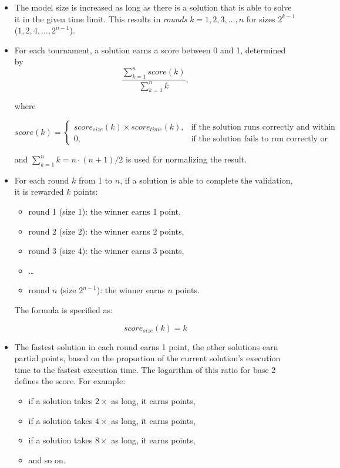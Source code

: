 \documentclass[submission,copyright,creativecommons]{eptcs}
\begin{document}
\begin{itemize}
	\item The model size is increased as long as there is a solution that is able to solve it in the given time limit. This results in \emph{rounds} $k = 1, 2, 3, \ldots, n$ for sizes $2^{k-1}$ ($1, 2, 4, \ldots, 2^{n-1}$).  
	\item For each tournament, a solution earns a score between 0 and 1, determined by
	\[\frac{\sum^{\mathit{n}}_{k=1} \mathit{score}(k)}{\sum^{\mathit{n}}_{k=1} k}, \]
	
	where
	
	\[
	\mathit{score}(k) =
	\begin{cases}
	\mathit{score}_\mathit{size}(k) \times \mathit{score}_\mathit{time}(k), & \text{if the solution runs correctly and within the given time limit,}\\
	0,                                                                      & \text{if the solution fails to run correctly or exceeds the given time limit,}
	\end{cases}
	\]
	
	and $\sum^{\mathit{n}}_{k=1} k = \mathit{n}\cdot(\mathit{n}+1)/2$ is used for normalizing the result.
	
	\item For each round $\mathit{k}$ from 1 to $n$, if a solution is able to complete the validation, it is rewarded $k$ points:
	\begin{itemize}
		\item round 1 (size 1): the winner earns 1 point,
		\item round 2 (size 2): the winner earns 2 points,
		\item round 3 (size 4): the winner earns 3 points,
		\item \ldots
		\item round $n$ (size $2^{n-1}$): the winner earns $n$ points.
	\end{itemize}
	
	The formula is specified as:
	
	\[ \mathit{score}_\mathit{size}(k)= k \]
	
	\item The fastest solution in each round earns 1 point, the other solutions earn partial points, based on the proportion of the current solution's execution time to the fastest execution time. The logarithm of this ratio for base 2 defines the score. For example:
	\begin{itemize}
		\item if a solution takes $2 \times$ as long, it earns  points, 
		\item if a solution takes $4 \times$ as long, it earns  points,
		\item if a solution takes $8 \times$ as long, it earns  points,
		\item and so on.
	\end{itemize}
	

\end{itemize}
\end{document}
